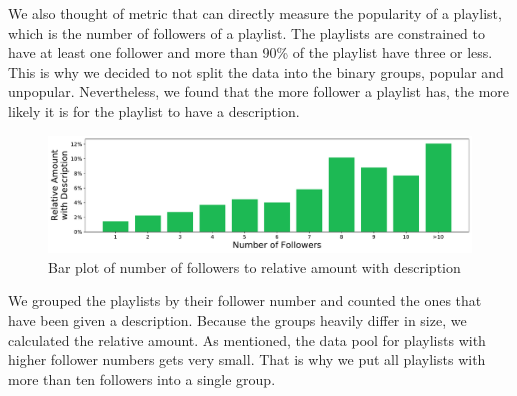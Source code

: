 We also thought of metric that can directly measure the popularity of a playlist, which is the number of followers of a playlist. The playlists are constrained to have at least one follower and more than 90\% of the playlist have three or less. This is why we decided to not split the data into the binary groups, popular and unpopular. Nevertheless, we found that the more follower a playlist has, the more likely it is for the playlist to have a description.

\begin{figure}[ht]
    \centering
    \includegraphics[width=\textwidth]{fig/followers_to_description.pdf}
    \caption{Bar plot of number of followers to relative amount with description}
    \label{fig:followers_to_description}
\end{figure}

We grouped the playlists by their follower number and counted the ones that have been given a description. Because the groups heavily differ in size, we calculated the relative amount. As mentioned, the data pool for playlists with higher follower numbers gets very small. That is why we put all playlists with more than ten followers into a single group.